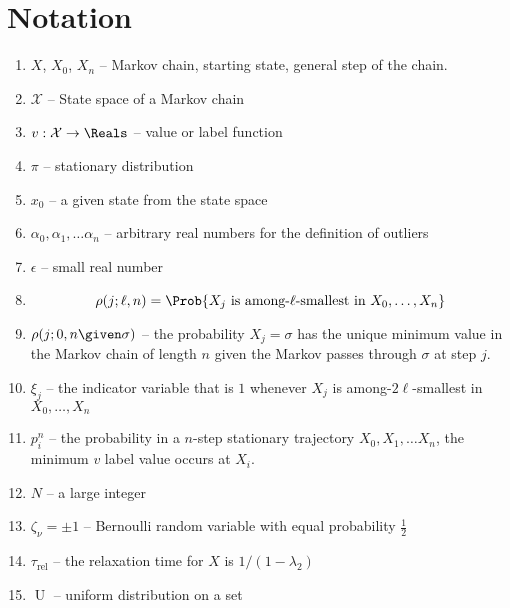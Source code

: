 \documentclass[12pt]{article}
\begin{document}
\section*{Notation}
\begin{enumerate}
    \item
        \( X \), \( X_0 \), \( X_n \) -- Markov chain, starting state,
        general step of the chain.
    \item
        \( \mathcal{X} \) -- State space of a Markov chain
    \item
        \( v :  \mathcal{X} \to \Reals \) -- value or label function
    \item
        \( \pi \) -- stationary distribution
    \item
        \( x_0 \) -- a given state from the state space
    \item
        \( \alpha_0, \alpha_1, \dots \alpha_n \) -- arbitrary real
        numbers for the definition of outliers
    \item
        \( \epsilon \) -- small real number
    \item
        \[
            \rho(j; \ell, n) = \Prob{X_j \text{ is among-\( \ell \)-smallest
            in } X_0, \dots, X_n }
        \]
    \item
        \( \rho(j; 0, n \given \sigma) \) -- the probability \( X_j =
        \sigma \) has the unique minimum value in the Markov chain of
        length \( n \) given the Markov passes through \( \sigma \) at
        step \( j \).
    \item
        \( \xi_j \) -- the indicator variable that is \( 1 \) whenever \(
        X_j \) is among-\( 2\ell \)-smallest in \( X_0, \dots , X_n \)
    \item
        \( p_i^n \) -- the probability in a \( n \)-step stationary
        trajectory \( X_0, X_1, \dots X_n \), the minimum \( v \) label
        value occurs at \( X_i \).
    \item
        \( N \) -- a large integer
    \item
        \( \zeta_{\nu} = \pm 1 \) -- Bernoulli random variable with
        equal probability \( \frac{1}{2} \)
    \item
        \( \tau_{\text{rel}} \) -- the relaxation time for \( X \) is \(
        1/ (1-\lambda_2) \)
    \item
        \(
        \operatorname{U}
        \) -- uniform distribution on a set
\end{enumerate}

\end{document}
